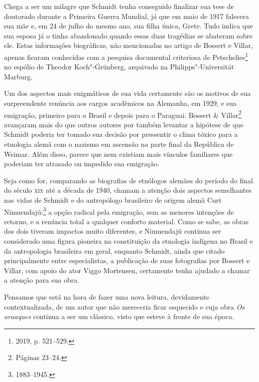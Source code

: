 Chega a ser um milagre que Schmidt tenha conseguido finalizar sua tese de
doutorado durante a Primeira Guerra Mundial, já que em maio de 1917
falecera sua mãe e, em 24 de julho do mesmo ano, sua filha única, Grete.
Tudo indica que sua esposa já o tinha abandonado quando essas duas
tragédias se abateram sobre ele. Estas informações biográficas, não
mencionadas no artigo de Bossert e Villar, apenas ficaram
conhecidas com a pesquisa documental criteriosa de Petschelies\footnote{2019, p.
521--529.} no espólio de Theodor Koch"-Grünberg, arquivado na
Philipps"-Universität Marburg.

Um dos aspectos mais enigmáticos de sua vida certamente são os motivos
de sua surpreendente renúncia aos cargos acadêmicos na Alemanha, em
1929, e sua emigração, primeiro para o Brasil e depois para o Paraguai.
Bossert \& Villar\footnote{Páginas 23--24.} avançaram mais do que outros autores
por também levantar a hipótese de que Schmidt poderia ter tomado sua
decisão por pressentir o clima tóxico para a etnologia alemã com o
nazismo em ascensão na parte final da República de Weimar. Além disso,
parece que nem existiam mais vínculos familiares que poderiam ter
atrasado ou impedido sua emigração.

Seja como for, comparando as biografias de etnólogos alemães do período
do final do século \textsc{xix} até a década de 1940, chamam a atenção dois
aspectos semelhantes nas vidas de Schmidt e do antropólogo brasileiro de
origem alemã Curt Nimuendajú:\footnote{1883--1945.} a opção radical pela
emigração, sem as menores intenções de retorno, e a renúncia total a
qualquer conforto material. Como se sabe, as obras dos dois tiveram
impactos muito diferentes, e Nimuendajú continua ser considerado uma
figura pioneira na constituição da etnologia indígena no Brasil e da
antropologia brasileira em geral, enquanto Schmidt, ainda que citado
principalmente entre especialistas, a publicação de suas
fotografias por Bossert e Villar, com apoio do ator Viggo
Mortensen, certamente tenha ajudado a chamar a atenção para sua obra.

Pensamos que está na hora de fazer uma nova leitura, devidamente
contextualizada, de um autor que não mereceria ficar esquecido e cuja
obra \textit{Os aruaques} continua a ser um clássico, visto que esteve à
frente de sua época.


